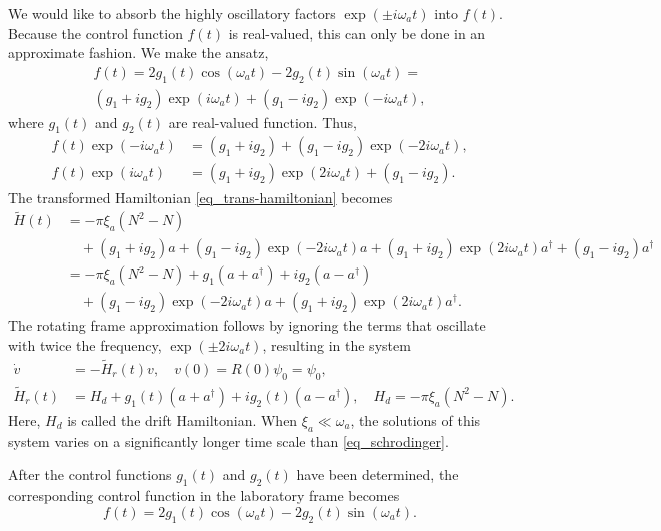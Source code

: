\documentclass[11pt]{article}
\begin{document}
We would like to absorb the highly oscillatory factors $\exp(\pm i\omega_a t)$ into
$f(t)$. Because the control function $f(t)$ is real-valued, this can only be done in an
approximate fashion. We make the ansatz,
\begin{multline}
  f(t) = 2g_1(t) \cos(\omega_a t) - 2g_2(t) \sin(\omega_a t) = \\
  \left(g_1 + i g_2\right)\exp(i\omega_a t) + \left( g_1 - i g_2 \right)
  \exp(-i\omega_a t),
\end{multline}
where $g_1(t)$ and $g_2(t)$ are real-valued function. Thus,
\begin{align}
f(t)\exp(-i\omega_a t) &= \left(g_1 + ig_2\right) +  \left(g_1 - ig_2\right)
\exp(-2i\omega_a t),\\
%
f(t)\exp(i\omega_a t) &= \left(g_1 + i g_2\right)\exp(2i\omega_a t) +  \left(g_1 - ig_2\right).
\end{align}
The transformed Hamiltonian \eqref{eq_trans-hamiltonian} becomes
\begin{align*}
\widetilde{H}(t) &= -\pi\xi_a \left(N^2 - N\right) \\
&\quad +\left(g_1 + i g_2\right) a +  \left(g_1 - i g_2\right) \exp(-2i\omega_a t) a +
%
\left(g_1 + i g_2\right)\exp(2i\omega_a t) a^\dag +  \left(g_1 - i g_2\right) a^\dag \\
%
&= -\pi\xi_a \left(N^2 - N\right) + g_1\left( a + a^\dag \right) + i g_2 \left( a - a^\dag \right)
\\
&\quad +
\left(g_1 - ig_2\right) \exp(-2i\omega_a t) a  + \left(g_1 + ig_2\right)\exp(2i\omega_a t) a^\dag.
\end{align*}
The rotating frame approximation follows by ignoring the terms that oscillate with twice the
frequency, $\exp(\pm 2i\omega_a t)$, resulting in the system
\begin{align}
\dot{v} &= - \widetilde{H}_r(t) v,\quad v(0) = R(0) \psi_0 = \psi_0,\\
%
\widetilde{H}_r(t) &=  H_d + g_1(t)\left( a + a^\dag \right) + i g_2(t) \left( a - a^\dag
\right),\quad H_d = -\pi\xi_a \left(N^2 - N\right).
\end{align}
Here, $H_d$ is called the drift Hamiltonian. When $\xi_a \ll \omega_a$, the solutions of this system
varies on a significantly longer time scale than \eqref{eq_schrodinger}.

After the control functions $g_1(t)$ and $g_2(t)$ have been determined, the corresponding control
function in the laboratory frame becomes
\begin{equation}\label{eq_control_lab}
f(t) = 2g_1(t) \cos(\omega_a t) - 2g_2(t) \sin(\omega_a t).
\end{equation}
\end{document}
